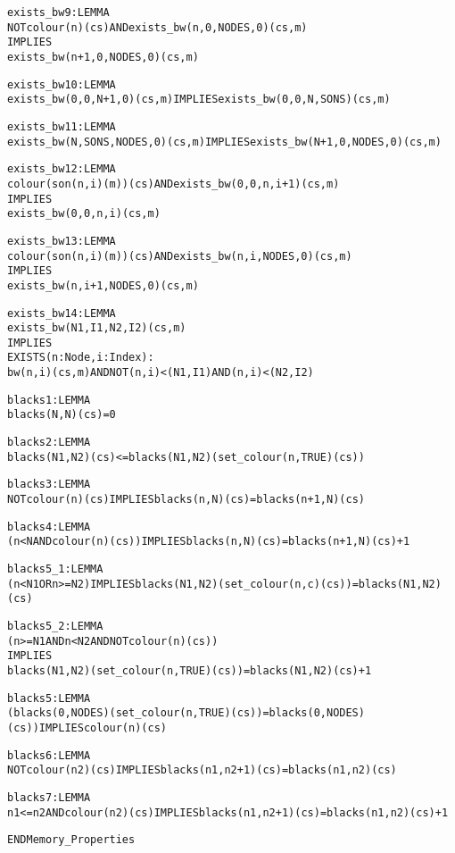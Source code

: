 \begin{alltt}
  exists_bw9 : LEMMA
    NOT colour(n)(cs) AND exists_bw(n, 0, NODES, 0)(cs, m)
      IMPLIES 
    exists_bw(n + 1, 0, NODES, 0)(cs, m)
  
  exists_bw10 : LEMMA 
    exists_bw(0, 0, N + 1, 0)(cs, m) IMPLIES exists_bw(0, 0, N, SONS)(cs, m)
  
  exists_bw11 : LEMMA
    exists_bw(N, SONS, NODES, 0)(cs, m) IMPLIES exists_bw(N + 1, 0, NODES, 0)(cs, m)
  
  exists_bw12 : LEMMA
    colour(son(n, i)(m))(cs) AND exists_bw(0, 0, n, i + 1)(cs, m)
      IMPLIES 
    exists_bw(0, 0, n, i)(cs, m)
  
  exists_bw13 : LEMMA
    colour(son(n, i)(m))(cs) AND exists_bw(n, i, NODES, 0)(cs, m)
      IMPLIES 
    exists_bw(n, i + 1, NODES, 0)(cs, m)
  
  exists_bw14 : LEMMA
    exists_bw(N1, I1, N2, I2)(cs, m)
      IMPLIES 
    EXISTS (n: Node, i: Index):
      bw(n, i)(cs, m) AND NOT (n, i) < (N1, I1) AND (n, i) < (N2, I2)
  
  blacks1 : LEMMA 
    blacks(N, N)(cs) = 0
  
  blacks2 : LEMMA 
    blacks(N1, N2)(cs) <= blacks(N1, N2)(set_colour(n, TRUE)(cs))
  
  blacks3 : LEMMA 
    NOT colour(n)(cs) IMPLIES blacks(n, N)(cs) = blacks(n + 1, N)(cs)
  
  blacks4 : LEMMA 
    (n < N AND colour(n)(cs)) IMPLIES blacks(n, N)(cs) = blacks(n + 1, N)(cs) + 1
  
  blacks5_1 : LEMMA
    (n < N1 OR n >= N2) IMPLIES blacks(N1, N2)(set_colour(n, c)(cs)) = blacks(N1, N2)(cs)
  
  blacks5_2 : LEMMA
    (n >= N1 AND n < N2 AND NOT colour(n)(cs))
      IMPLIES 
    blacks(N1, N2)(set_colour(n, TRUE)(cs)) = blacks(N1, N2)(cs) + 1
  
  blacks5 : LEMMA
    (blacks(0, NODES)(set_colour(n, TRUE)(cs)) = blacks(0, NODES)(cs)) IMPLIES colour(n)(cs)
  
  blacks6 : LEMMA 
    NOT colour(n2)(cs) IMPLIES blacks(n1, n2 + 1)(cs) = blacks(n1, n2)(cs)
  
  blacks7 : LEMMA
    n1 <= n2 AND colour(n2)(cs) IMPLIES blacks(n1, n2 + 1)(cs) = blacks(n1, n2)(cs) + 1
  
END Memory_Properties
\end{alltt}


